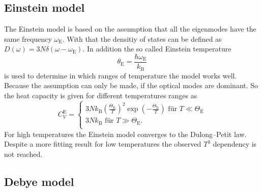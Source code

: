 \subsection{Einstein model}
\label{ssec:theory3}

The Einstein model is based on the assumption that all the eigenmodes have the same frequency $\omega_\text{E}$.
With that the densitiy of states can be defined as $D (\omega) = 3 N \delta (\omega - \omega_\text{E})$.
In addition the so called Einstein temperature 
\begin{equation}
    \theta_\text{E} = \frac{\hbar \omega_\text{E}}{k_\text{B}}
    \label{eq:einstein}
\end{equation}
is used to determine in which ranges of temperature the model works well.
Because the assumption can only be made, if the optical modes are dominant.
So the heat capacity is given for different temperatures ranges as
\begin{equation}
    C_V^\text{E} =
      \begin{cases}
        3 N k_\text{B} \left( \frac{\Theta_\text{E}}{T}   \right)^2 \exp(- \frac{\Theta_\text{E}}{T}) \,\, \text{für} \,\,  T \ll \Theta_\text{E}\\
        3 N k_\text{B} \,\, \text{für} \,\, T \gg \Theta_\text{E}.\\
        \end{cases}
\end{equation}
For high temperatures the Einstein model converges to the Dulong–Petit law.
Despite a more fitting result for low temperatures the observed $T^3$ dependency is not reached.

\subsection{Debye model}
\label{ssec:theory4}

